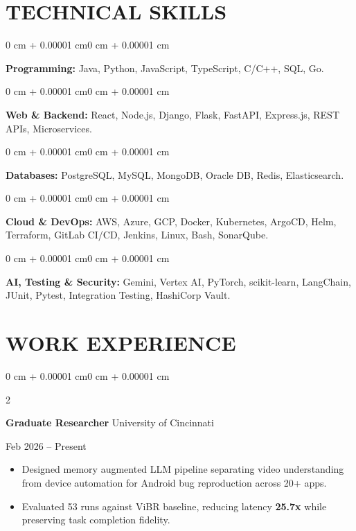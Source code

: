 \documentclass[10pt, letterpaper]{article}
\newenvironment{highlights}{
    \begin{itemize}[
        topsep=0.10 cm,
        parsep=0.06 cm,
        partopsep=0pt,
        itemsep=0.06 cm,
        leftmargin=12pt
    ]
}{
    \end{itemize}
}
\newenvironment{onecolentry}{
    \begin{adjustwidth}{0 cm + 0.00001 cm}{0 cm + 0.00001 cm}
}{
    \end{adjustwidth}
}
\newenvironment{twocolentry}[2][]{
    \onecolentry
    \def\secondColumn{#2}
    \setcolumnwidth{\fill, 4.5 cm}
    \begin{paracol}{2}
}{
    \switchcolumn \raggedleft \secondColumn
    \end{paracol}
    \endonecolentry
}
\begin{document}
\section{TECHNICAL SKILLS}
\begin{onecolentry}
\textbf{Programming:} Java, Python, JavaScript, TypeScript, C/C++, SQL, Go.
\end{onecolentry}
\vspace{0.06 cm}
\begin{onecolentry}
\textbf{Web \& Backend:} React, Node.js, Django, Flask, FastAPI, Express.js, REST APIs, Microservices.
\end{onecolentry}
\vspace{0.06 cm}
\begin{onecolentry}
\textbf{Databases:} PostgreSQL, MySQL, MongoDB, Oracle DB, Redis, Elasticsearch.
\end{onecolentry}
\vspace{0.06 cm}
\begin{onecolentry}
\textbf{Cloud \& DevOps:} AWS, Azure, GCP, Docker, Kubernetes, ArgoCD, Helm, Terraform, GitLab CI/CD, Jenkins, Linux, Bash, SonarQube.
\end{onecolentry}
\vspace{0.06 cm}
\begin{onecolentry}
\textbf{AI, Testing \& Security:} Gemini, Vertex AI, PyTorch, scikit-learn, LangChain, JUnit, Pytest, Integration Testing, HashiCorp Vault.
\end{onecolentry}

\section{WORK EXPERIENCE}
\begin{twocolentry}{Feb 2026 -- Present}
\textbf{Graduate Researcher} \textbar{} University of Cincinnati
\end{twocolentry}
\begin{highlights}
  \item Designed memory augmented LLM pipeline separating video understanding from device automation for Android bug reproduction across 20+ apps.
  \item Evaluated 53 runs against ViBR baseline, reducing latency \textbf{25.7x} while preserving task completion fidelity.
\end{highlights}

\vspace{0.15 cm}
\end{document}
